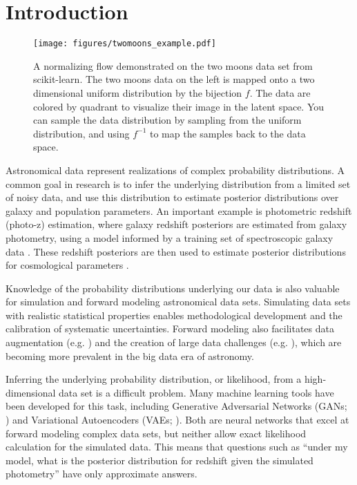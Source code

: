 \documentclass[twocolumn,twocolappendix,linenumbers]{aastex631}
\begin{document}
\section{Introduction}
\label{sec:intro}

\begin{figure*}[t]
    \begin{centering}
        \texttt{[image: figures/twomoons\_example.pdf]}
        \caption{
            A normalizing flow demonstrated on the two moons data set from scikit-learn.
            The two moons data on the left is mapped onto a two dimensional uniform distribution by the bijection $f$.
            The data are colored by quadrant to visualize their image in the latent space.
            You can sample the data distribution by sampling from the uniform distribution, and using $f^{-1}$ to map the samples back to the data space.
        }
        \label{fig:two-moons}
    \end{centering}
\end{figure*}

Astronomical data represent realizations of complex probability distributions.
A common goal in research is to infer the underlying distribution from a limited set of noisy data, and use this distribution to estimate posterior distributions over galaxy and population parameters.
An important example is photometric redshift (photo-z) estimation, where galaxy redshift posteriors are estimated from galaxy photometry, using a model informed by a training set of spectroscopic galaxy data \citep{newman2022}.
These redshift posteriors are then used to estimate posterior distributions for cosmological parameters \citep{descSRD}.

Knowledge of the probability distributions underlying our data is also valuable for simulation and forward modeling astronomical data sets.
Simulating data sets with realistic statistical properties enables methodological development and the calibration of systematic uncertainties.
Forward modeling also facilitates data augmentation (e.g. \citealt{lokken2022}) and the creation of large data challenges (e.g. \citealt{kessler2019, dc2, cosmodc2}), which are becoming more prevalent in the big data era of astronomy.

Inferring the underlying probability distribution, or likelihood, from a high-dimensional data set is a difficult problem.
Many machine learning tools have been developed for this task, including Generative Adversarial Networks (GANs; \citealt{goodfellow2014}) and Variational Autoencoders (VAEs; \citealt{kingma2014}).
Both are neural networks that excel at forward modeling complex data sets, but neither allow exact likelihood calculation for the simulated data.
This means that questions such as ``under my model, what is the posterior distribution for redshift given the simulated photometry'' have only approximate answers.
\end{document}

